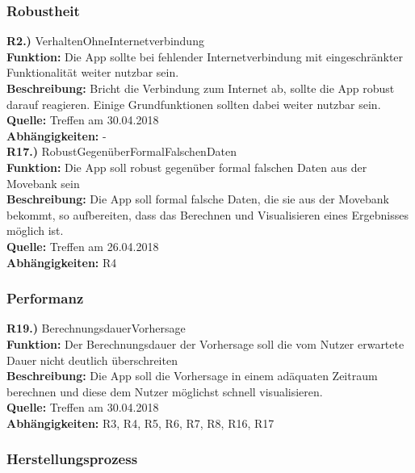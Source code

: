 \documentclass[12pt]{article} %
\begin{document}
\subsubsection{Robustheit}

\textbf{R2.)} VerhaltenOhneInternetverbindung \\
\textbf{Funktion:} Die App sollte bei fehlender Internetverbindung mit eingeschränkter Funktionalität weiter nutzbar sein. \\
\textbf{Beschreibung:} Bricht die Verbindung zum Internet ab, sollte die App robust darauf reagieren. Einige Grundfunktionen sollten dabei weiter nutzbar sein. \\
\textbf{Quelle:} Treffen am 30.04.2018 \\
\textbf{Abhängigkeiten:} - \\

\textbf{R17.)} RobustGegenüberFormalFalschenDaten \\
\textbf{Funktion:} Die App soll robust gegenüber formal falschen Daten aus der Movebank sein \\
\textbf{Beschreibung:} Die App soll formal falsche Daten, die sie aus der Movebank bekommt, so aufbereiten, dass das Berechnen und Visualisieren eines Ergebnisses möglich ist. \\
\textbf{Quelle:} Treffen am 26.04.2018 \\
\textbf{Abhängigkeiten:} R4 \\

\subsubsection{Performanz}

\textbf{R19.)} BerechnungsdauerVorhersage \\
\textbf{Funktion:} Der Berechnungsdauer der Vorhersage soll die vom Nutzer erwartete Dauer nicht deutlich überschreiten \\
\textbf{Beschreibung:} Die App soll die Vorhersage in einem adäquaten Zeitraum berechnen und diese dem Nutzer möglichst schnell visualisieren. \\
\textbf{Quelle:} Treffen am 30.04.2018 \\
\textbf{Abhängigkeiten:} R3, R4, R5, R6, R7, R8, R16, R17 \\

\subsubsection{Herstellungsprozess}
\end{document}
